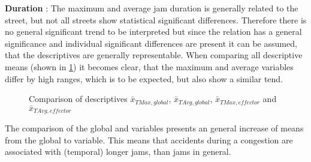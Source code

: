 \textbf{Duration} : The maximum and average jam duration is generally related to the street, but not all streets show statistical significant differences. Therefore there is no general significant trend to be interpreted but since the relation has a general significance and individual significant differences are present it can be assumed, that the descriptives are generally representable. When comparing all descriptive means (shown in \cref{fig:baysis_summary_Str_duration_barplot}) it becomes clear, that the maximum and average variables differ by high ranges, which is to be expected, but also show a similar tend.
\begin{figure}[ht!]
    \data
    \pgfplotstablesort[sort key=means, sort cmp=float >]{\datasorted}{\data}
    \tiny
    \centering
    \caption{Comparison of descriptives $\bar{x}_{TMax,global}$, $\bar{x}_{TAvg,global}$, $\bar{x}_{TMax,effector}$ and $\bar{x}_{TAvg,effector}$}
    \label{fig:baysis_summary_Str_duration_barplot}
\end{figure}
The comparison of the global and  variables presents an general increase of means from the global to  variable. This means that accidents during a congestion are associated with (temporal) longer jams, than jams in general.

